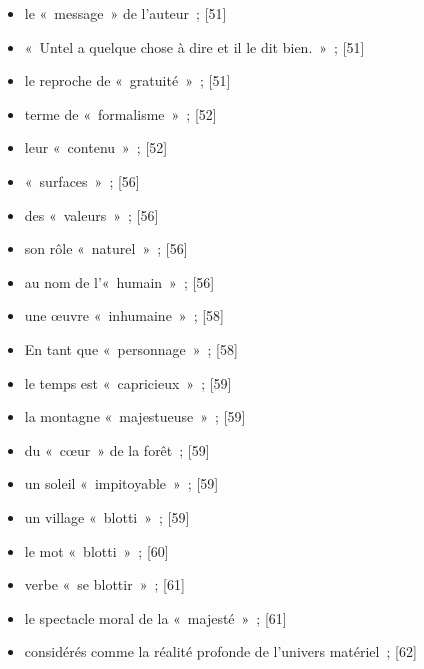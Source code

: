 \documentclass[12pt, a4paper]{article}
\begin{document}
\begin{itemize}
	\item le «~message~» de l’auteur{\color{gray}~; [51]}

	\item «~Untel a quelque chose à dire et il le dit bien.~»{\color{gray}~; [51]}

	\item le reproche de «~gratuité~»{\color{gray}~; [51]}

	\item terme de «~formalisme~»{\color{gray}~; [52]}

	\item leur «~contenu~»{\color{gray}~; [52]}

	\item «~surfaces~»{\color{gray}~; [56]}

	\item des «~valeurs~»{\color{gray}~; [56]}

	\item son rôle «~naturel~»{\color{gray}~; [56]}

	\item au nom de l’«~humain~»{\color{gray}~; [56]}

	\item une œuvre «~inhumaine~»{\color{gray}~; [58]}

	\item En tant que «~personnage~»{\color{gray}~; [58]}

	\item le temps est «~capricieux~»{\color{gray}~; [59]}

	\item la montagne «~majestueuse~»{\color{gray}~; [59]}

	\item du «~cœur~» de la forêt{\color{gray}~; [59]}

	\item un soleil «~impitoyable~»{\color{gray}~; [59]}

	\item un village «~blotti~»{\color{gray}~; [59]}

	\item le mot «~blotti~»{\color{gray}~; [60]}

	\item verbe «~se blottir~»{\color{gray}~; [61]}

	\item le spectacle moral de la «~majesté~»{\color{gray}~; [61]}

	\item considérés comme la réalité profonde de l’univers matériel{\color{gray}~; [62]}


\end{itemize}
\end{document}
